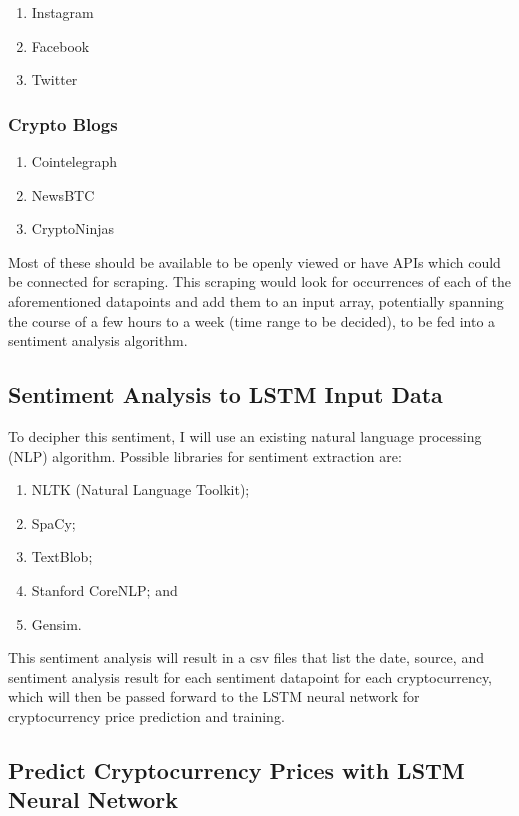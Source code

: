 \documentclass[10pt,twocolumn]{article}
\begin{document}
\begin{enumerate}
    \item Instagram
    \item Facebook
    \item Twitter
\end{enumerate}

\subsubsection{Crypto Blogs}

\begin{enumerate}
    \item Cointelegraph
    \item NewsBTC
    \item CryptoNinjas
\end{enumerate}

Most of these should be available to be openly viewed or have APIs which could be connected for scraping. This scraping would look for occurrences of each of the aforementioned datapoints and add them to an input array, potentially spanning the course of a few hours to a week (time range to be decided), to be fed into a sentiment analysis algorithm.

\subsection{Sentiment Analysis to LSTM Input Data}

To decipher this sentiment, I will use an existing natural language processing (NLP) algorithm. Possible libraries for sentiment extraction are:

\begin{enumerate}
    \item NLTK (Natural Language Toolkit);
    \item SpaCy;
    \item TextBlob;
    \item Stanford CoreNLP; and
    \item Gensim.
\end{enumerate}

This sentiment analysis will result in a csv files that list the date, source, and sentiment analysis result for each sentiment datapoint for each cryptocurrency, which will then be passed forward to the LSTM neural network for cryptocurrency price prediction and training.

\subsection{Predict Cryptocurrency Prices with LSTM Neural Network}
\end{document}
